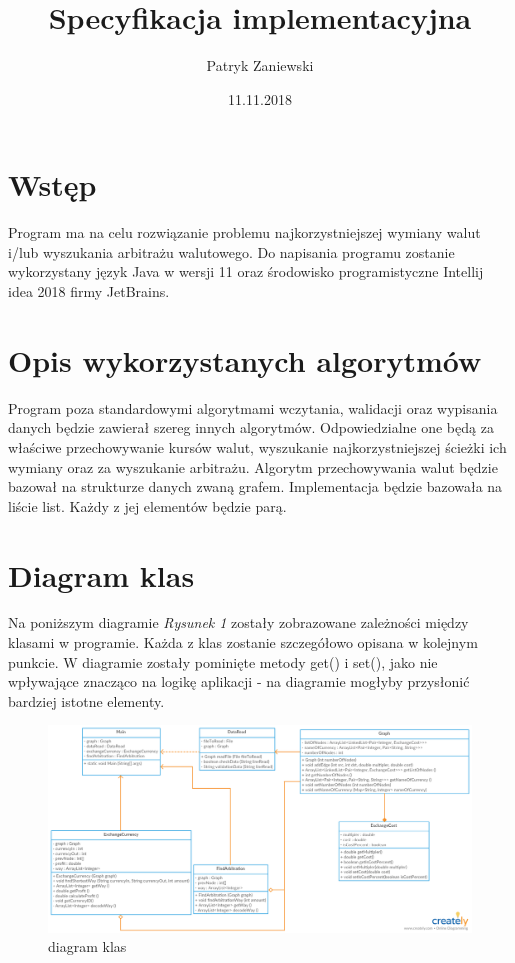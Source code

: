 \documentclass[12pt]{article}
\title{Specyfikacja implementacyjna}
\author{Patryk Zaniewski}
\date{11.11.2018}
\begin{document}
\maketitle

\tableofcontents
\newpage

\section{Wstęp}
Program ma na celu rozwiązanie problemu najkorzystniejszej wymiany walut i/lub wyszukania arbitrażu walutowego. Do napisania programu zostanie wykorzystany język Java w wersji 11 oraz środowisko programistyczne Intellij idea 2018 firmy JetBrains.

\section{Opis wykorzystanych algorytmów}
Program poza standardowymi algorytmami wczytania, walidacji oraz wypisania danych będzie zawierał szereg innych algorytmów. Odpowiedzialne one będą za właściwe przechowywanie kursów walut, wyszukanie najkorzystniejszej ścieżki ich wymiany oraz za wyszukanie arbitrażu.
\newline\newline
Algorytm przechowywania walut będzie bazował na strukturze danych zwaną grafem. Implementacja będzie bazowała na liście list. Każdy z jej elementów będzie parą.


 
\section{Diagram klas}
Na poniższym diagramie \emph{Rysunek 1} zostały zobrazowane zależności między klasami w programie. Każda z klas zostanie szczegółowo opisana w kolejnym punkcie. W diagramie zostały pominięte metody get() i set(), jako nie wpływające znacząco na logikę aplikacji - na diagramie mogłyby przysłonić bardziej istotne elementy.

\begin{figure}[h!]
\centering
\includegraphics[scale=0.5]{diagram}
\caption{diagram klas}
\label{fig:diagram}
\end{figure}
\end{document}
